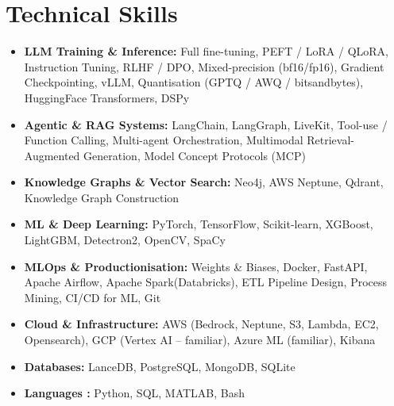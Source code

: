 \documentclass[letterpaper,11pt]{article}
\begin{document}
\section{Technical Skills}
\begin{itemize}[leftmargin=0.15in, label={}]
    \small
    \item \textbf{LLM Training \& Inference:} Full fine-tuning, PEFT / LoRA / QLoRA, Instruction Tuning, RLHF / DPO, Mixed-precision (bf16/fp16), Gradient Checkpointing, vLLM, Quantisation (GPTQ / AWQ / bitsandbytes), HuggingFace Transformers, DSPy
    \item \textbf{Agentic \& RAG Systems:} LangChain, LangGraph, LiveKit, Tool-use / Function Calling, Multi-agent Orchestration, Multimodal Retrieval-Augmented Generation, Model Concept Protocols (MCP)
    \item \textbf{Knowledge Graphs \& Vector Search:} Neo4j, AWS Neptune, Qdrant, Knowledge Graph Construction
    \item \textbf{ML \& Deep Learning:} PyTorch, TensorFlow, Scikit-learn, XGBoost, LightGBM, Detectron2, OpenCV, SpaCy
    \item \textbf{MLOps \& Productionisation:} Weights \& Biases, Docker, FastAPI, Apache Airflow, Apache Spark(Databricks), ETL Pipeline Design, Process Mining, CI/CD for ML, Git
    \item \textbf{Cloud \& Infrastructure:} AWS (Bedrock, Neptune, S3, Lambda, EC2, Opensearch), GCP (Vertex AI -- familiar), Azure ML (familiar), Kibana
    \item \textbf{Databases:} LanceDB, PostgreSQL, MongoDB, SQLite
    \item \textbf{Languages :} Python, SQL, MATLAB, Bash
\end{itemize}

\end{document}
